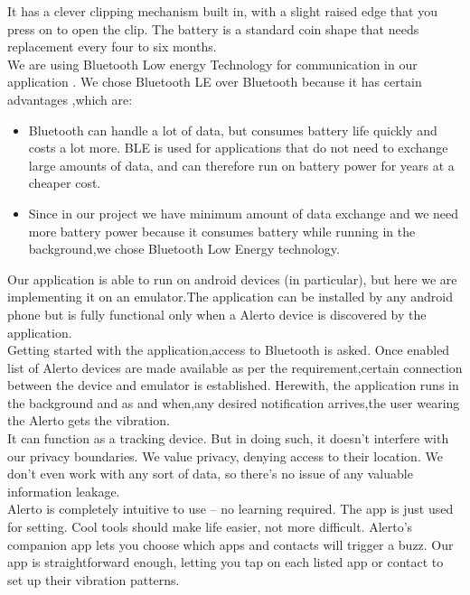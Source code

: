 \documentclass[12pt,a4paper]{report}
\begin{document}
\hspace{0.2 in}It has a clever clipping mechanism built in, with a slight raised edge that you press on to open the clip. The battery is a standard coin shape that needs replacement every four to six months.\\

\hspace{0.2 in}We are using Bluetooth Low energy Technology for communication in our application . We chose Bluetooth LE over Bluetooth  because it  has certain advantages ,which are:
\begin{itemize}
	\item Bluetooth can handle a lot of data, but consumes battery life quickly and costs a lot more. BLE is used for applications that do not need to exchange large amounts of data, and can therefore run on battery power for years at a cheaper cost.
	\item Since in our project we have minimum amount of data exchange and we need more battery power because it consumes battery while running in the background,we chose Bluetooth Low Energy technology.
\end{itemize}

\hspace{0.2 in}Our application is able to run on android devices (in particular), but here we are implementing it on an emulator.The application can be installed by any android phone but is fully functional only when a Alerto device is discovered by the application.\\

\hspace{0.2 in}Getting started with the application,access to Bluetooth is asked. Once enabled list of Alerto devices are made available as per the requirement,certain connection between the  device and  emulator is established. Herewith, the application runs in the background and as and when,any desired notification arrives,the user wearing the Alerto gets the vibration.\\

\hspace{0.2 in}It can function as a tracking device. But in doing such, it doesn’t interfere with our privacy boundaries. We value privacy, denying access to their location. We don’t even work with any sort of data, so there’s no issue of any valuable information leakage.\\

\hspace{0.2 in}Alerto is completely intuitive to use – no learning required. The app 
is just used for setting.  Cool tools should make life easier, not more difficult. Alerto’s companion app lets you choose which apps and contacts will trigger a buzz. Our app is straightforward enough, letting you tap on each listed app or contact to set up their vibration patterns.
\end{document}
